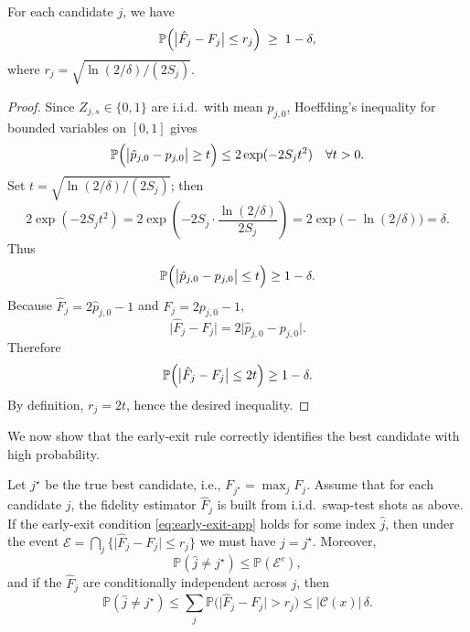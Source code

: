 \documentclass[11pt]{article}
\begin{document}
\begin{lemma}
\label{lem:hoeffding}
For each candidate \(j\), we have
\begin{equation}
  \mathbb{P}\Bigl(
    \bigl|\hat{F}_j - F_j\bigr|
    \le r_j
  \Bigr)
  \;\ge\;
  1-\delta,
\end{equation}
where \(r_j = \sqrt{\ln(2/\delta)/(2 S_j)}\).
\end{lemma}

\begin{proof}
Since \(Z_{j,s}\in\{0,1\}\) are i.i.d.\ with mean \(p_{j,0}\),
Hoeffding's inequality for bounded variables on \([0,1]\) gives
\begin{equation}
  \mathbb{P}\Bigl(\bigl|\hat{p}_{j,0} - p_{j,0}\bigr| \ge t\Bigr)
  \le 2 \exp(-2 S_j t^2)
  \quad
  \forall t>0.
\end{equation}
Set \(t = \sqrt{\ln(2/\delta)/(2 S_j)}\); then
\begin{equation}
  2 \exp(-2 S_j t^2)
  =
  2 \exp\left(
    -2 S_j \cdot \frac{\ln(2/\delta)}{2 S_j}
  \right)
  =
  2 \exp\bigl(-\ln(2/\delta)\bigr)
  =
  \delta.
\end{equation}
Thus
\begin{equation}
  \mathbb{P}\Bigl(
    \bigl|\hat{p}_{j,0} - p_{j,0}\bigr|
    \le t
  \Bigr)
  \ge 1-\delta.
\end{equation}
Because \(\hat{F}_j = 2\hat{p}_{j,0}-1\) and \(F_j = 2 p_{j,0}-1\),
\begin{equation}
  \bigl|\hat{F}_j - F_j\bigr|
  =
  2 \bigl|\hat{p}_{j,0} - p_{j,0}\bigr|.
\end{equation}
Therefore
\begin{equation}
  \mathbb{P}\Bigl(
    \bigl|\hat{F}_j - F_j\bigr|
    \le 2 t
  \Bigr)
  \ge 1-\delta.
\end{equation}
By definition, \(r_j = 2 t\), hence the desired inequality.
\end{proof}

We now show that the early-exit rule correctly identifies the best
candidate with high probability.

\begin{theorem}
\label{thm:correct-early-exit}
Let \(j^\star\) be the true best candidate, i.e.,
\(F_{j^\star} = \max_j F_j\).
Assume that for each candidate \(j\), the fidelity estimator
\(\hat{F}_j\) is built from i.i.d.\ swap-test shots as above.
If the early-exit condition \eqref{eq:early-exit-app} holds for some
index \(\hat{j}\), then under the event
\(\mathcal{E} = \bigcap_j \{\lvert \hat{F}_j - F_j\rvert \le r_j\}\)
we must have \(\hat{j} = j^\star\).
Moreover,
\begin{equation}
  \mathbb{P}(\hat{j} \neq j^\star)
  \le
  \mathbb{P}(\mathcal{E}^c),
\end{equation}
and if the \(\hat{F}_j\) are conditionally independent across \(j\), then
\begin{equation}
  \mathbb{P}(\hat{j} \neq j^\star)
  \le
  \sum_j \mathbb{P}\bigl(\lvert \hat{F}_j - F_j\rvert > r_j\bigr)
  \le
  |\mathcal{C}(x)| \,\delta.
\end{equation}
\end{theorem}
\end{document}
